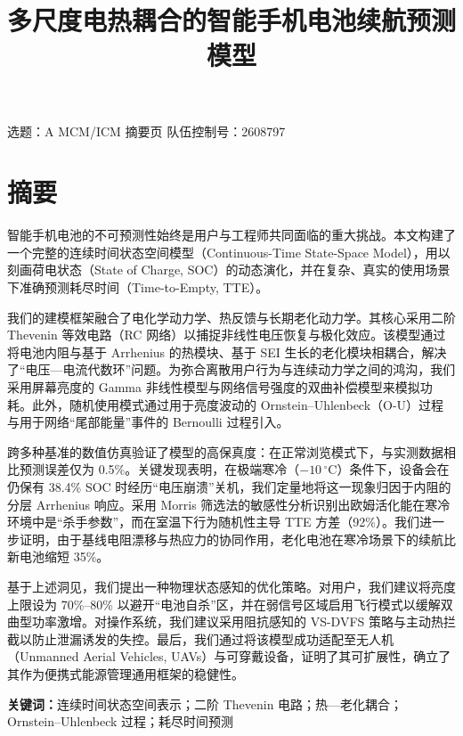 \documentclass[11pt,a4paper]{ctexart}
\title{多尺度电热耦合的智能手机电池续航预测模型}
\author{}
\date{}
\newcommand{\degC}{\ensuremath{^{\circ}\mathrm{C}}}
\begin{document}
\maketitle

\begin{center}
\small 选题：A  MCM/ICM 摘要页 \quad 队伍控制号：2608797
\end{center}
\vspace{0.5em}

\section*{摘要}

智能手机电池的不可预测性始终是用户与工程师共同面临的重大挑战。本文构建了一个完整的连续时间状态空间模型（Continuous-Time State-Space Model），用以刻画荷电状态（State of Charge, SOC）的动态演化，并在复杂、真实的使用场景下准确预测耗尽时间（Time-to-Empty, TTE）。

我们的建模框架融合了电化学动力学、热反馈与长期老化动力学。其核心采用二阶 Thevenin 等效电路（RC 网络）以捕捉非线性电压恢复与极化效应。该模型通过将电池内阻与基于 Arrhenius 的热模块、基于 SEI 生长的老化模块相耦合，解决了“电压—电流代数环”问题。为弥合离散用户行为与连续动力学之间的鸿沟，我们采用屏幕亮度的 Gamma 非线性模型与网络信号强度的双曲补偿模型来模拟功耗。此外，随机使用模式通过用于亮度波动的 Ornstein--Uhlenbeck（O-U）过程与用于网络“尾部能量”事件的 Bernoulli 过程引入。

跨多种基准的数值仿真验证了模型的高保真度：在正常浏览模式下，与实测数据相比预测误差仅为 0.5\%。关键发现表明，在极端寒冷（$-10\,\degC$）条件下，设备会在仍保有 38.4\% SOC 时经历“电压崩溃”关机，我们定量地将这一现象归因于内阻的分层 Arrhenius 响应。采用 Morris 筛选法的敏感性分析识别出欧姆活化能在寒冷环境中是“杀手参数”，而在室温下行为随机性主导 TTE 方差（92\%）。我们进一步证明，由于基线电阻漂移与热应力的协同作用，老化电池在寒冷场景下的续航比新电池缩短 35\%。

基于上述洞见，我们提出一种物理状态感知的优化策略。对用户，我们建议将亮度上限设为 70\%--80\% 以避开“电池自杀”区，并在弱信号区域启用飞行模式以缓解双曲型功率激增。对操作系统，我们建议采用阻抗感知的 VS-DVFS 策略与主动热拦截以防止泄漏诱发的失控。最后，我们通过将该模型成功适配至无人机（Unmanned Aerial Vehicles, UAVs）与可穿戴设备，证明了其可扩展性，确立了其作为便携式能源管理通用框架的稳健性。

\noindent\textbf{关键词：}连续时间状态空间表示；二阶 Thevenin 电路；热—老化耦合；Ornstein--Uhlenbeck 过程；耗尽时间预测
\end{document}
